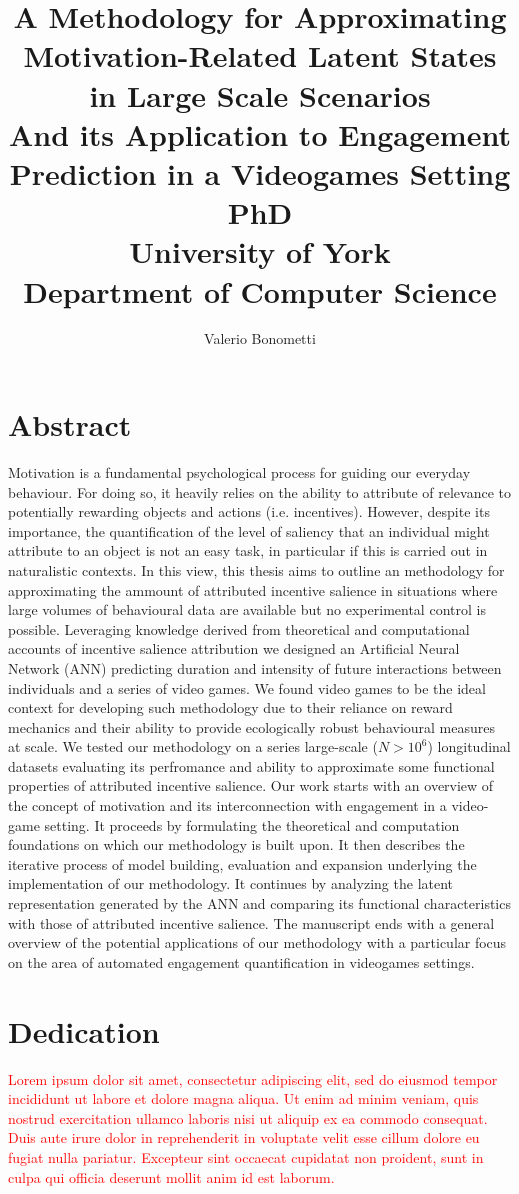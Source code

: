 \documentclass{yorkThesis}
\title{
{A Methodology for Approximating Motivation-Related Latent States in Large Scale Scenarios}\\
{\small And its Application to Engagement Prediction in a Videogames Setting}\\
{\Large PhD}\\
{\large University of York}\\
{\large Department of Computer Science}\\

}
\author{Valerio Bonometti}
\newcommand{\lorem}{\textcolor{red}{Lorem ipsum dolor sit amet, consectetur adipiscing elit, sed do eiusmod tempor incididunt ut labore et dolore magna aliqua. Ut enim ad minim veniam, quis nostrud exercitation ullamco laboris nisi ut aliquip ex ea commodo consequat. Duis aute irure dolor in reprehenderit in voluptate velit esse cillum dolore eu fugiat nulla pariatur. Excepteur sint occaecat cupidatat non proident, sunt in culpa qui officia deserunt mollit anim id est laborum.\\}}
\begin{document}
\maketitle

\chapter*{Abstract}
Motivation is a fundamental psychological process for guiding our everyday behaviour. For doing so, it heavily relies on the ability to attribute of relevance to potentially rewarding objects and actions (i.e. incentives). However, despite its importance, the quantification of the level of saliency that an individual might attribute to an object is not an easy task,  in particular if this is carried out in naturalistic contexts. In this view, this thesis aims to outline an methodology for approximating the ammount of attributed incentive salience in situations where large volumes of behavioural data are available but no experimental control is possible. Leveraging knowledge derived from theoretical and computational accounts of incentive salience attribution we designed an Artificial Neural Network (ANN) predicting duration and intensity of future interactions between individuals and a series of video games. We found video games to be the ideal context for developing such methodology due to their reliance on reward mechanics and their ability to provide ecologically robust behavioural measures at scale. We tested our methodology on a series large-scale ($N> 10^6$) longitudinal datasets evaluating its perfromance and ability to approximate some functional properties of attributed incentive salience. Our work starts with an overview of the concept of motivation and its interconnection with engagement in a video-game setting. It proceeds by formulating the theoretical and computation foundations on which our methodology is built upon. It then describes the iterative process of model building, evaluation and expansion underlying the implementation of our methodology. It continues by analyzing the latent representation generated by the ANN and comparing its functional characteristics with those of attributed incentive salience. The manuscript ends with a general overview of the potential applications of our methodology with a particular focus on the area of automated engagement quantification in videogames settings.

\chapter*{Dedication}
\lorem
\end{document}
